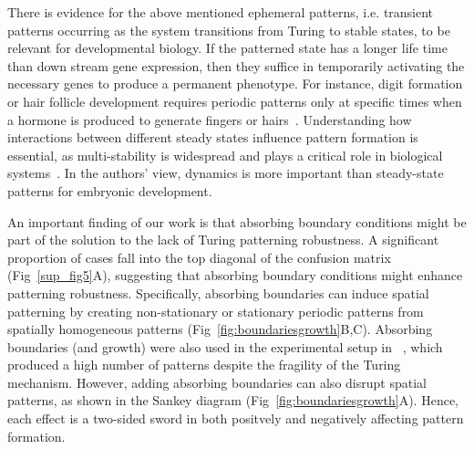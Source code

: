 There is evidence for the above mentioned ephemeral patterns, i.e. transient patterns occurring as the system transitions from Turing to stable states, to be relevant for developmental biology. If the patterned state has a longer life time than down stream gene expression, then they suffice in temporarily activating the necessary genes to produce a permanent phenotype.
For instance, digit formation or hair follicle development requires periodic patterns only at specific times when a hormone is produced to generate fingers or hairs~\parencite{raspopovic2014digit,glover2023developmental}. 
Understanding how interactions between different steady states influence pattern formation is essential, as multi-stability is widespread and plays a critical role in biological systems~\parencite{laurent1999multistability}. In the authors' view, dynamics is more important than steady-state patterns for embryonic development.


An important finding of our work is that absorbing boundary conditions might be part of the solution to the lack of Turing patterning robustness. A significant proportion of cases fall into the top diagonal of the confusion matrix (Fig~\ref{sup_fig5}A), suggesting that absorbing boundary conditions might enhance patterning robustness.
Specifically, absorbing boundaries can induce spatial patterning by creating non-stationary or stationary periodic patterns from spatially homogeneous patterns (Fig~\ref{fig:boundariesgrowth}B,C). Absorbing boundaries (and growth) were also used in the experimental setup in ~\parencite{Oliver2023}, which produced a high number of patterns despite the fragility of the Turing mechanism. However, adding absorbing boundaries can also disrupt spatial patterns, as shown in the Sankey diagram (Fig~\ref{fig:boundariesgrowth}A). Hence, each effect is a two-sided sword in both positvely and negatively affecting pattern formation.

